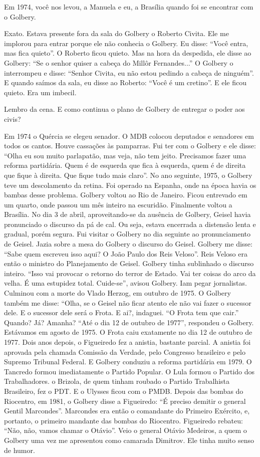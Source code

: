  Em 1974, você nos levou, a Manuela e eu, a Brasília quando foi se
encontrar com o Golbery.

 Exato. Estava presente fora da sala do Golbery o Roberto Civita. Ele
me implorou para entrar porque ele não conhecia o Golbery. Eu disse:
``Você entra, mas fica quieto''. O Roberto ficou quieto. Mas na hora da
despedida, ele disse ao Golbery: ``Se o senhor quiser a cabeça do Millôr
Fernandes...'' O Golbery o interrompeu e disse: ``Senhor Civita, eu não
estou pedindo a cabeça de ninguém''. E quando saímos da sala, eu disse
ao Roberto: ``Você é um cretino''. E ele ficou quieto. Era um imbecil.

 Lembro da cena. E como continua o plano de Golbery de entregar o
poder aos civis?

 Em 1974 o Quércia se elegeu senador. O MDB colocou deputados e
senadores em todos os cantos. Houve cassações às pamparras. Fui ter com
o Golbery e ele disse: ``Olha eu sou muito parlapatão, mas veja, não tem
jeito. Precisamos fazer uma reforma partidária. Quem é de esquerda que
fica à esquerda, quem é de direita que fique à direita. Que fique tudo
mais claro''. No ano seguinte, 1975, o Golbery teve um descolamento da
retina. Foi operado na Espanha, onde na época havia os bambas desse
problema. Golbery voltou ao Rio de Janeiro. Ficou entrevado em um
quarto, onde passou um mês inteiro na escuridão. Finalmente voltou a
Brasília. No dia 3 de abril, aproveitando-se da ausência de Golbery,
Geisel havia pronunciado o discurso da pá de cal. Ou seja, estava
encerrada a distensão lenta e gradual, porém segura. Fui visitar o
Golbery no dia seguinte ao pronunciamento de Geisel. Jazia sobre a mesa
do Golbery o discurso do Geisel. Golbery me disse: ``Sabe quem escreveu
isso aqui? O João Paulo dos Reis Veloso''. Reis Veloso era então o
ministro do Planejamento de Geisel. Golbery tinha sublinhado o discurso
inteiro. ``Isso vai provocar o retorno do terror de Estado. Vai ter
coisas do arco da velha. É uma estupidez total. Cuide-se'', avisou
Golbery. Iam pegar jornalistas. Culminou com a morte do Vlado Herzog, em
outubro de 1975. O Golbery também me disse: ``Olha, se o Geisel não
ficar atento ele não vai fazer o sucessor dele. E o sucessor dele será o
Frota. E ai?, indaguei. ``O Frota tem que cair.'' Quando? Já? Amanha?
``Até o dia 12 de outubro de 1977'', respondeu o Golbery. Estávamos em
agosto de 1975. O Frota caiu exatamente no dia 12 de outubro de 1977.
Dois anos depois, o Figueiredo fez a anistia, bastante parcial. A
anistia foi aprovada pela chamada Comissão da Verdade, pelo Congresso
brasileiro e pelo Supremo Tribunal Federal. E Golbery conduziu a reforma
partidária em 1979. O Tancredo formou imediatamente o Partido Popular. O
Lula formou o Partido dos Trabalhadores. o Brizola, de quem tinham
roubado o Partido Trabalhista Brasileiro, fez o PDT. E o Ulysses ficou
com o PMDB. Depois das bombas do Riocentro, em 1981, o Golbery disse a
Figueiredo: ``É preciso demitir o general Gentil Marcondes''. Marcondes
era então o comandante do Primeiro Exército, e, portanto, o primeiro
mandante das bombas do Riocentro. Figueiredo rebateu: ``Não, não, vamos
chamar o Otávio''. Veio o general Otávio Medeiros, a quem o Golbery uma
vez me apresentou como camarada Dimitrov. Ele tinha muito senso de
humor.

